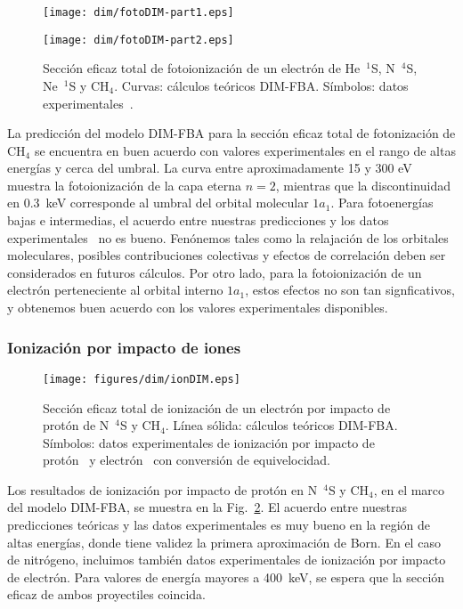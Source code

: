 \begin{figure}
\centering
\texttt{[image: dim/fotoDIM-part1.eps]} 

\vspace{-1.15cm}
\texttt{[image: dim/fotoDIM-part2.eps]}
\caption[Fotoionización de He, N, Ne y CH$_4$.]
{Sección eficaz total de fotoionización de un electrón de He~$^1$S, 
N~$^4$S, Ne~$^1$S y CH$_4$. Curvas: cálculos teóricos DIM-FBA. Símbolos: 
datos experimentales~\cite{Samson:90,Henke:93,Stolte:16,Samson:02,
Lukirskii:64,Henke:82,Samson:89}.}
\label{fig:photoDIM}
\end{figure}

La predicción del modelo DIM-FBA para la sección eficaz total de 
fotonización de CH$_4$ se encuentra en buen acuerdo con valores 
experimentales en el rango de altas energías y cerca del umbral. La 
curva entre aproximadamente 15 y 300 eV muestra la fotoionización de la 
capa eterna $n=2$, mientras que la discontinuidad en $0.3$~keV 
corresponde al umbral del orbital molecular $1a_1$. Para fotoenergías 
bajas e intermedias, el acuerdo entre nuestras predicciones y los datos 
experimentales~\cite{Lukirskii:64,Henke:82,Samson:89} no es bueno. 
Fenónemos tales como la relajación de los orbitales moleculares, 
posibles contribuciones colectivas y efectos de correlación deben ser  
considerados en futuros cálculos. Por otro lado, para la fotoionización 
de un electrón perteneciente al orbital interno $1a_1$, estos efectos no 
son tan signficativos, y obtenemos buen acuerdo con los valores 
experimentales disponibles. 

\subsubsection{Ionización por impacto de iones}
\label{subsec:dimion}

\begin{figure}
\centering
\texttt{[image: figures/dim/ionDIM.eps]}
\caption[Ionización por impacto de protón de N y CH$_4$.]
{Sección eficaz total de ionización de un electrón por impacto de protón 
de N~$^4$S y CH$_4$. Línea sólida: cálculos teóricos DIM-FBA. 
Símbolos: datos experimentales de ionización por impacto de 
protón~\cite{Rudd:83,Rudd:85} y electrón~\cite{Brook:78} con conversión 
de equivelocidad.}
\label{fig:iondim}
\end{figure}

Los resultados de ionización por impacto de protón en N~$^4$S y CH$_4$, 
en el marco del modelo DIM-FBA, se muestra en la Fig.~\ref{fig:iondim}. 
El acuerdo entre nuestras predicciones teóricas y las datos 
experimentales es muy bueno en la región de altas energías, donde tiene 
validez la primera aproximación de Born. En el caso de nitrógeno, 
incluimos también datos experimentales de ionización por impacto de 
electrón. Para valores de energía mayores a 400~keV, se espera que la 
sección eficaz de ambos proyectiles coincida. 

